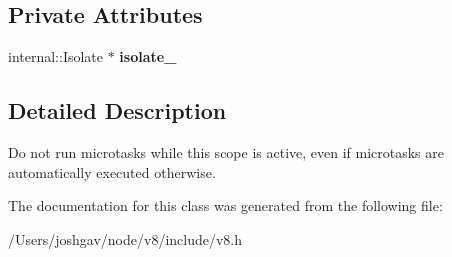 \subsection*{Private Attributes}
\begin{DoxyCompactItemize}
\item 
internal\+::\+Isolate $\ast$ {\bfseries isolate\+\_\+}\hypertarget{classv8_1_1_isolate_1_1_suppress_microtask_execution_scope_a1d3f31824c96bc8db01a0eb8bb6137d4}{}\label{classv8_1_1_isolate_1_1_suppress_microtask_execution_scope_a1d3f31824c96bc8db01a0eb8bb6137d4}

\end{DoxyCompactItemize}


\subsection{Detailed Description}
Do not run microtasks while this scope is active, even if microtasks are automatically executed otherwise. 

The documentation for this class was generated from the following file\+:\begin{DoxyCompactItemize}
\item 
/\+Users/joshgav/node/v8/include/v8.\+h\end{DoxyCompactItemize}
